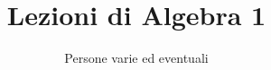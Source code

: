 \documentclass[a4paper,NoNotes,GeneralMath]{stdmdoc}
\begin{document}
	\title{Lezioni di Algebra 1}
	\author{Persone varie ed eventuali}
\end{document}
